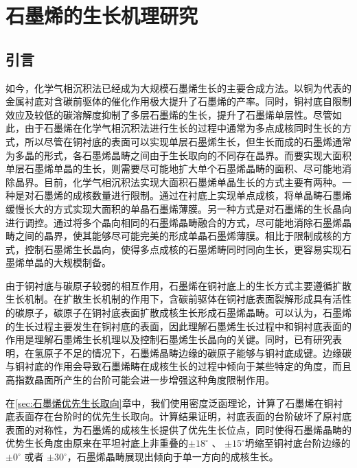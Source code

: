 \chapter{石墨烯的生长机理研究}
\section{引言}
    如今，化学气相沉积法已经成为大规模石墨烯生长的主要合成方法。以铜为代表的金属衬底对含碳前驱体的催化作用极大提升了石墨烯的产率。同时，铜衬底自限制效应及较低的碳溶解度抑制了多层石墨烯的生长，提升了石墨烯单层性。尽管如此，由于石墨烯在化学气相沉积法进行生长的过程中通常为多点成核同时生长的方式，所以尽管在铜衬底的表面可以实现单层石墨烯生长，但生长而成的石墨烯通常为多晶的形式，各石墨烯晶畴之间由于生长取向的不同存在晶界。而要实现大面积单层石墨烯单晶的生长，则需要尽可能地扩大单个石墨烯晶畴的面积、尽可能地消除晶界。目前，化学气相沉积法实现大面积石墨烯单晶生长的方式主要有两种。一种是对石墨烯的成核数量进行限制。通过在衬底上实现单点成核，将单晶畴石墨烯缓慢长大的方式实现大面积的单晶石墨烯薄膜。另一种方式是对石墨烯的生长晶向进行调控。通过将多个晶向相同的石墨烯晶畴融合的方式，尽可能地消除石墨烯晶畴之间的晶界，使其能够尽可能完美的形成单晶石墨烯薄膜。相比于限制成核的方式，控制石墨烯生长晶向，使得多点成核的石墨烯畴同时同向生长，更容易实现石墨烯单晶的大规模制备。%
    
    由于铜衬底与碳原子较弱的相互作用，石墨烯在铜衬底上的生长方式主要遵循扩散生长机制。在扩散生长机制的作用下，含碳前驱体在铜衬底表面裂解形成具有活性的碳原子，碳原子在铜衬底表面扩散成核生长形成石墨烯晶畴。可以认为，石墨烯的生长过程主要发生在铜衬底的表面，因此理解石墨烯生长过程中和铜衬底表面的作用是理解石墨烯生长机理以及控制石墨烯生长晶向的关键。同时，已有研究表明，在氢原子不足的情况下，石墨烯晶畴边缘的碳原子能够与铜衬底成键。边缘碳与铜衬底的作用会导致石墨烯畴在成核生长的过程中倾向于某些特定的角度，而且高指数晶面所产生的台阶可能会进一步增强这种角度限制作用。%
    


    在\ref{sec:石墨烯优先生长取向}章中，我们使用密度泛函理论，计算了石墨烯在铜衬底表面存在台阶时的优先生长取向。计算结果证明，衬底表面的台阶破坏了原衬底表面的对称性，为石墨烯的成核生长提供了优先生长位点，同时使得石墨烯晶畴的优势生长角度由原来在平坦衬底上非重叠的$\pm 18 ^{\circ}$ 、 $\pm 15 ^{\circ}$坍缩至铜衬底台阶边缘的$\pm 0 ^{\circ}$ 或者 $\pm 30 ^{\circ}$，石墨烯晶畴展现出倾向于单一方向的成核生长。


